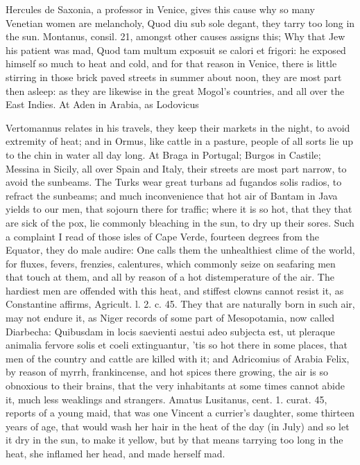 {{Hercules de Saxonia, a professor in Venice, gives this cause why
so many Venetian women are melancholy, Quod diu sub sole degant, they
tarry too long in the sun. Montanus, consil. 21, amongst other causes
assigns this; Why that Jew his patient was mad, Quod tam multum
exposuit se calori et frigori: he exposed himself so much to heat and
cold, and for that reason in Venice, there is little stirring in those
brick paved streets in summer about noon, they are most part then
asleep: as they are likewise in the great Mogol's countries, and all
over the East Indies. At Aden in Arabia, as Lodovicus

Vertomannus relates in his travels, they keep their markets in the
night, to avoid extremity of heat; and in Ormus, like cattle in a
pasture, people of all sorts lie up to the chin in water all day long.
At Braga in Portugal; Burgos in Castile; Messina in Sicily, all over
Spain and Italy, their streets are most part narrow, to avoid the
sunbeams. The Turks wear great turbans ad fugandos solis radios, to
refract the sunbeams; and much inconvenience that hot air of Bantam in
Java yields to our men, that sojourn there for traffic; where it is so
hot, that they that are sick of the pox, lie commonly bleaching
in the sun, to dry up their sores. Such a complaint I read of those
isles of Cape Verde, fourteen degrees from the Equator, they do male
audire: One calls them the unhealthiest clime of the world, for
fluxes, fevers, frenzies, calentures, which commonly seize on seafaring
men that touch at them, and all by reason of a hot distemperature of
the air. The hardiest men are offended with this heat, and stiffest
clowns cannot resist it, as Constantine affirms, Agricult. l. 2. c. 45.
They that are naturally born in such air, may not endure it, as
Niger records of some part of Mesopotamia, now called Diarbecha:
Quibusdam in locis saevienti aestui adeo subjecta est, ut pleraque
animalia fervore solis et coeli extinguantur, 'tis so hot there in some
places, that men of the country and cattle are killed with it; and
Adricomius of Arabia Felix, by reason of myrrh, frankincense, and
hot spices there growing, the air is so obnoxious to their brains, that
the very inhabitants at some times cannot abide it, much less weaklings
and strangers. Amatus Lusitanus, cent. 1. curat. 45, reports of a
young maid, that was one Vincent a currier's daughter, some thirteen
years of age, that would wash her hair in the heat of the day (in July)
and so let it dry in the sun, to make it yellow, but by that
means tarrying too long in the heat, she inflamed her head, and made
herself mad.

}}
